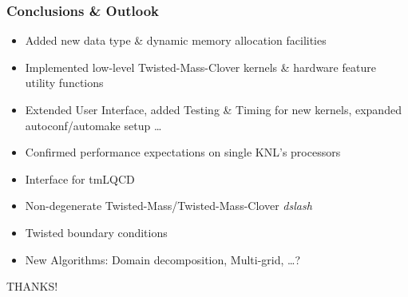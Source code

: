 \documentclass{beamer}
\begin{document}
  \begin{frame}
    \frametitle{Conclusions \& Outlook}

    \begin{itemize}
      \item Added new data type \& dynamic memory allocation facilities
      \item Implemented low-level Twisted-Mass-Clover kernels \& hardware feature utility functions
      \item Extended User Interface, added Testing \& Timing for new kernels,
        expanded autoconf/automake setup \dots
      \item Confirmed performance expectations on single KNL's processors
        \vspace{5mm}
        \pause
      \item Interface for tmLQCD
      \item Non-degenerate Twisted-Mass/Twisted-Mass-Clover \textit{dslash}
      \item Twisted boundary conditions
      \item New Algorithms: Domain decomposition, Multi-grid, \dots ?
        \vfill
    \end{itemize}
    \pause

    \begin{center}
      \Large THANKS!
    \end{center}

  \end{frame}





\end{document}
